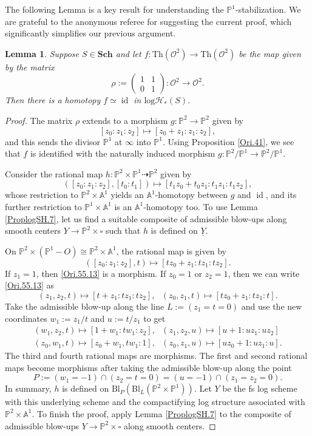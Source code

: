 \documentclass[11pt, a4paper]{amsart}
\newtheorem{lem}[thm]{Lemma}
\theoremstyle{definition}
\numberwithin{equation}{subsection}
\renewcommand{\P}{\mathbb{P}}
\newcommand{\A}{\mathbb{A}}
\newcommand{\Sch}{\mathbf{Sch}}
\newcommand{\id}{\operatorname{id}}   			%
\newcommand{\Blow}{{\mathrm{Bl}}}
\newcommand{\Thom}{\mathrm{Th}}
\renewcommand{\ul}{\underline}
\newcommand{\cO}{\mathcal{O}}
\newcommand{\boxx}{\square}
\newcommand{\inflogHpt}{\mathrm{log}\mathcal{H}_\ast}
\begin{document}
The following Lemma is a key result for understanding the $\P^1$-stabilization. We are grateful to the anonymous referee for suggesting the current proof, which significantly simplifies our previous argument.
\begin{lem}
\label{Ori.55}
Suppose $S\in \Sch$ and let $f\colon \Thom(\cO^2)\to \Thom(\cO^2)$ be the map given by the matrix
\[
\rho:=
\left(
\begin{array}{cc}
1 & 1
\\
0 & 1
\end{array}
\right)
\colon
\cO^2
\to 
\cO^2.
\]
Then there is a homotopy $f\simeq \id$ in $\inflogHpt(S)$.
\end{lem}
\begin{proof}
The matrix $\rho$ extends to a morphism $g\colon \P^2\to \P^2$ given by
\[
[z_0:z_1:z_2] \mapsto [z_0+z_1:z_1:z_2],
\]
and this sends the divisor $\P^1$ at $\infty$ into $\P^1$.
Using Proposition \ref{Ori.41},
we see that $f$ is identified with the naturally induced morphism $g\colon \P^2/\P^1\to \P^2/\P^1$.

Consider the rational map $h\colon \P^2\times \P^1\dashrightarrow \P^2$ given by
\[
([z_0:z_1:z_2],[t_0:t_1])\mapsto [t_1 z_0+t_0z_1:t_1z_1:t_1z_2],
\]
whose restriction to $\P^2\times \A^1$ yields an $\A^1$-homotopy between $g$ and $\id$, and its further restriction to $\P^1\times \A^1$ is an $\A^1$-homotopy too.
To use Lemma \ref{ProplogSH.7},
let us find a suitable composite of admissible blow-ups along smooth centers $Y\to \P^2\times \boxx$ such that $h$ is defined on $\ul{Y}$.

On $\P^2\times (\P^1-O)\cong \P^2\times \A^1$, the rational map is given by
\begin{equation}
\label{Ori.55.13}
([z_0:z_1:z_2],t)\mapsto [tz_0+z_1:tz_1:tz_2].
\end{equation}
If $z_1=1$, then \eqref{Ori.55.13} is a morphism.
If $z_0=1$ or $z_2=1$, then we can write \eqref{Ori.55.13} as
\[
(z_1,z_2,t)\mapsto [t+z_1:tz_1:tz_2],
\text{ }
(z_0,z_1,t)\mapsto [tz_0+z_1:tz_1:t].
\]
Take the admissible blow-up along the line $L:=(z_1=t=0)$ and use the new coordinates $w_1:=z_1/t$ and $u:=t/z_1$ to get
\begin{gather*}
(w_1,z_2,t)\mapsto [1+w_1:tw_1:z_2],
\text{ }
(z_1,z_2,u)\mapsto [u+1:uz_1:uz_2]
\\
(z_0,w_1,t)\mapsto [z_0+w_1,tw_1:1],
\text{ }
(z_0,z_1,u)\mapsto [uz_0+1:uz_1:u].
\end{gather*}
The third and fourth rational maps are morphisms.
The first and second rational maps become morphisms after taking the admissible blow-up along the point
\[
P:=(w_1=-1)\cap (z_2=t=0)=(u=-1)\cap (z_1=z_2=0).
\]
In summary, $h$ is defined on $\Blow_P (\Blow_L (\P^2\times \P^1))$.
Let $Y$ be the fs log scheme with this underlying scheme and the compactifying log structure associated with $\P^2\times \A^1$.
To finish the proof, apply Lemma \ref{ProplogSH.7} to the composite of admissible blow-ups $Y\to \P^2\times \square$ along smooth centers.
\end{proof}
\end{document}
